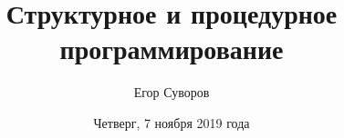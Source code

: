 \documentclass[utf8,xcolor=table]{beamer}
\title[Процедурное программирование]{Структурное и процедурное программирование}
\author{Егор Суворов}
\institute[НИУ ВШЭ]{Курс <<Основы программирования>>}
\date[07.11.2019]{Четверг, 7 ноября 2019 года}
\begin{document}
\begin{frame}
\titlepage
\end{frame}







\end{document}
